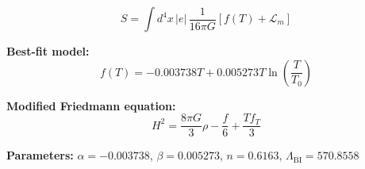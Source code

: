 
\begin{equation}
  S = \int d^4x \, |e| \, \frac{1}{16\pi G} \left[ f(T) + \mathcal{L}_m \right]
\end{equation}

\textbf{Best-fit model:}
\begin{equation}
  f(T) = -0.003738 T + 0.005273 T \ln\!\left(\frac{T}{T_0}\right)
\end{equation}

\textbf{Modified Friedmann equation:}
\begin{equation}
  H^2 = \frac{8\pi G}{3} \rho - \frac{f}{6} + \frac{T f_T}{3}
\end{equation}

\textbf{Parameters:}
$\alpha = -0.003738$, \quad
$\beta = 0.005273$, \quad
$n = 0.6163$, \quad
$\Lambda_{\text{BI}} = 570.8558$
